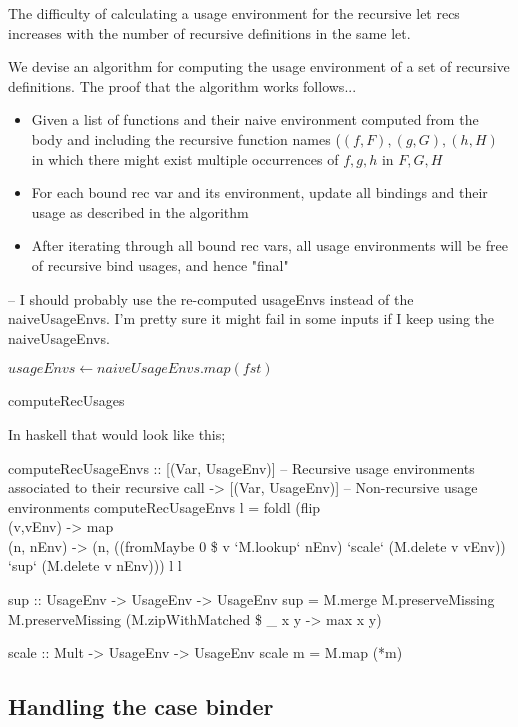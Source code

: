 \documentclass[a4paper, draft]{article}
\begin{document}
The difficulty of calculating a usage environment for the recursive let recs
increases with the number of recursive definitions in the same let.

We devise an algorithm for computing the usage environment of a set of recursive
definitions. The proof that the algorithm works follows...

\begin{itemize}
    \item Given a list of functions and their naive environment computed from
        the body and including the recursive function names ($(f, F), (g, G),
        (h, H)$ in which there might exist multiple occurrences of $f, g, h$ in $F, G, H$
    \item For each bound rec var and its environment, update all bindings and
        their usage as described in the algorithm
    \item After iterating through all bound rec vars, all usage environments
        will be free of recursive bind usages, and hence "final"
\end{itemize}

-- I should probably use the re-computed usageEnvs instead of the
naiveUsageEnvs. I'm pretty sure it might fail in some inputs if I keep using the
naiveUsageEnvs.
\begin{algorithm}
$usageEnvs \gets naiveUsageEnvs.map(fst)$\;
\caption{computeRecUsages}
\end{algorithm}

In haskell that would look like this;
\begin{code}
computeRecUsageEnvs :: [(Var, UsageEnv)] -- Recursive usage environments associated to their recursive call
                    -> [(Var, UsageEnv)] -- Non-recursive usage environments
computeRecUsageEnvs l =
  foldl (flip \\(v,vEnv) -> map \\(n, nEnv) -> (n, ((fromMaybe 0 \$ v `M.lookup` nEnv) `scale` (M.delete v vEnv)) `sup` (M.delete v nEnv))) l l

sup :: UsageEnv -> UsageEnv -> UsageEnv
sup = M.merge M.preserveMissing M.preserveMissing (M.zipWithMatched \$ \_ x y -> max x y)

scale :: Mult -> UsageEnv -> UsageEnv
scale m = M.map (*m)
\end{code}

\subsection{Handling the case binder}
\end{document}
